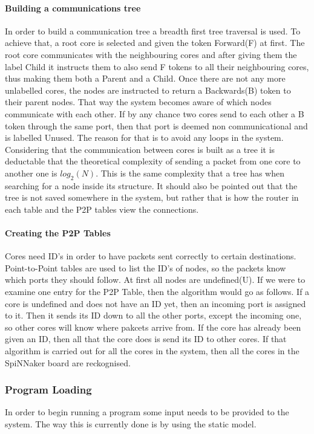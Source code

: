 \documentclass[12pt,a4paper]{article}
\begin{document}
\paragraph{Building a communications tree}
In order to build a communication tree a breadth first tree traversal is used. To achieve that, a root core is selected and given the token Forward(F) at first. The root core communicates with the neighbouring cores and after giving them the label Child it instructs them to also send F tokens to all their neighbouring cores, thus making them both a Parent and a Child. Once there are not any more unlabelled cores, the nodes are instructed to return a Backwards(B) token to their parent nodes. That way the system becomes aware of which nodes communicate with each other. If by any chance two cores send to each other a B token through the same port, then that port is deemed non communicational and is labelled Unused. The reason for that is to avoid any loops in the system\cite{jefflec}. Considering that the communication between cores is built as a tree it is deductable that the theoretical complexity of sending a packet from one core to another one is $log_2(N)$. This is the same complexity that a tree has when searching for a node inside its structure. It should also be pointed out that the tree is not saved somewhere in the system, but rather that is how the router in each table and the P2P tables view the connections.
\paragraph{Creating the P2P Tables}
Cores need ID's in order to have packets sent correctly to certain destinations. Point-to-Point tables are used to list the ID's of nodes, so the packets know which ports they should follow. At first all nodes are undefined(U). If we were to examine one entry for the P2P Table, then the algorithm would go as follows. If a core is undefined and does not have an ID yet, then an incoming port is assigned to it. Then it sends its ID down to all the other ports, except the incoming one, so other cores will know where pakcets arrive from. If the core has already been given an ID, then all that the core does is send its ID to other cores. If that algorithm is carried out for all the cores in the system, then all the cores in the SpiNNaker board are reckognised\cite{jefflec}.

\subsubsection{Program Loading}
In order to begin running a program some input needs to be provided to the system. The way this is currently done is by using the static model. 
\end{document}
